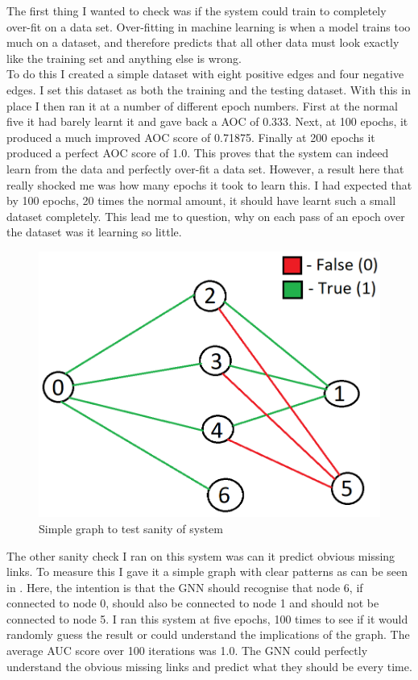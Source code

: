 \documentclass{l4proj}
\begin{document}
The first thing I wanted to check was if the system could train to completely over-fit on a data set. Over-fitting in machine learning is when a model trains too much on a dataset, and therefore predicts that all other data must look exactly like the training set and anything else is wrong. \\

To do this I created a simple dataset with eight positive edges and four negative edges. I set this dataset as both the training and the testing dataset. With this in place I then ran it at a number of different epoch numbers. First at the normal five it had barely learnt it and gave back a AOC of 0.333. Next, at 100 epochs, it produced a much improved AOC score of 0.71875. Finally at 200 epochs it produced a perfect AOC score of 1.0. This proves that the system can indeed learn from the data and perfectly over-fit a data set. However, a result here that really shocked me was how many epochs it took to learn this. I had expected that by 100 epochs, 20 times the normal amount, it should have learnt such a small dataset completely. This lead me to question, why on each pass of an epoch over the dataset was it learning so little. \\

\begin{figure}[h]
    \centering
    \includegraphics[width=0.5\linewidth]{images/sanity_graph.png}
    \caption{Simple graph to test sanity of system}
    \label{fig:sanity_graph}
\end{figure}

The other sanity check I ran on this system was can it predict obvious missing links. To measure this I gave it a simple graph with clear patterns as can be seen in . Here, the intention is that the GNN should recognise that node 6, if connected to node 0, should also be connected to node 1 and should not be connected to node 5. I ran this system at five epochs, 100 times to see if it would randomly guess the result or could understand the implications of the graph. The average AUC score over 100 iterations was 1.0. The GNN could perfectly understand the obvious missing links and predict what they should be every time. \\
\end{document}
